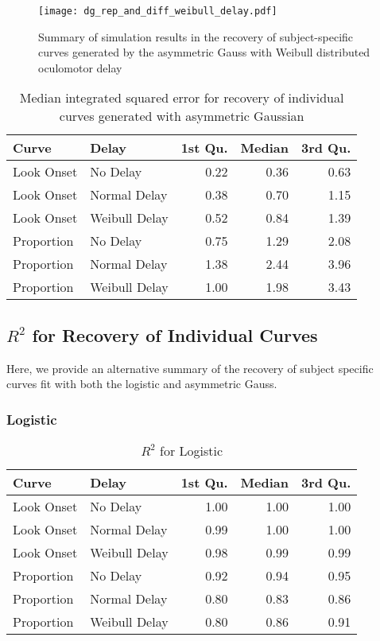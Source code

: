 \begin{figure}[H]
\centering
\texttt{[image: dg\_rep\_and\_diff\_weibull\_delay.pdf]}
\caption{Summary of simulation results in the recovery of subject-specific curves generated by the asymmetric Gauss with Weibull distributed oculomotor delay}
\label{fig:dg_rep_curves_weibull_delay}
\end{figure}




\begin{table}[H]
\centering
\begin{tabular}{llrrr}
  \hline
Curve & Delay & 1st Qu. & Median & 3rd Qu. \\ 
  \hline
Look Onset & No Delay & 0.22 & 0.36 & 0.63 \\ 
  Look Onset & Normal Delay & 0.38 & 0.70 & 1.15 \\ 
  Look Onset & Weibull Delay & 0.52 & 0.84 & 1.39 \\ 
  Proportion & No Delay & 0.75 & 1.29 & 2.08 \\ 
  Proportion & Normal Delay & 1.38 & 2.44 & 3.96 \\ 
  Proportion & Weibull Delay & 1.00 & 1.98 & 3.43 \\ 
   \hline
\end{tabular}
\caption{Median integrated squared error for recovery of individual curves generated with asymmetric Gaussian}
\label{tab:dg_mise_sims}
\end{table}

\subsection{$R^2$ for Recovery of Individual Curves}

Here, we provide an alternative summary of the recovery of subject specific curves fit with both the logistic and asymmetric Gauss. 


\subsubsection{Logistic}

\begin{table}[H]
\centering
\begin{tabular}{llrrr}
  \hline
Curve & Delay & 1st Qu. & Median & 3rd Qu. \\ 
  \hline
Look Onset & No Delay & 1.00 & 1.00 & 1.00 \\ 
  Look Onset & Normal Delay & 0.99 & 1.00 & 1.00 \\ 
  Look Onset & Weibull Delay & 0.98 & 0.99 & 0.99 \\ 
  Proportion & No Delay & 0.92 & 0.94 & 0.95 \\ 
  Proportion & Normal Delay & 0.80 & 0.83 & 0.86 \\ 
  Proportion & Weibull Delay & 0.80 & 0.86 & 0.91 \\ 
   \hline
\end{tabular}
\caption{$R^2$ for Logistic}
\label{tab:r2_logistic_sims}
\end{table}


